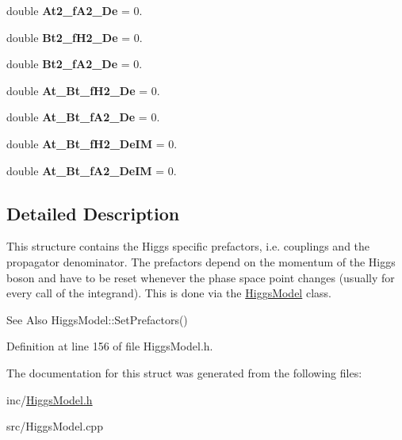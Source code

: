 \begin{DoxyCompactItemize}
\item 
\hypertarget{structHiggsPrefactors_a746d2ffd6c45dcdc4327a882d60a7f00}{double {\bfseries At2\-\_\-f\-A2\-\_\-\-De} = 0.}\label{structHiggsPrefactors_a746d2ffd6c45dcdc4327a882d60a7f00}

\item 
\hypertarget{structHiggsPrefactors_a28e6599f560ee1403abf1309d27f26e9}{double {\bfseries Bt2\-\_\-f\-H2\-\_\-\-De} = 0.}\label{structHiggsPrefactors_a28e6599f560ee1403abf1309d27f26e9}

\item 
\hypertarget{structHiggsPrefactors_a894d0baffbd6d76931cc9be61045dfd8}{double {\bfseries Bt2\-\_\-f\-A2\-\_\-\-De} = 0.}\label{structHiggsPrefactors_a894d0baffbd6d76931cc9be61045dfd8}

\item 
\hypertarget{structHiggsPrefactors_ab9024702de8509302dd74bdadf053f87}{double {\bfseries At\-\_\-\-Bt\-\_\-f\-H2\-\_\-\-De} = 0.}\label{structHiggsPrefactors_ab9024702de8509302dd74bdadf053f87}

\item 
\hypertarget{structHiggsPrefactors_a54f50c68645cb1897f2cc4031ecac7fd}{double {\bfseries At\-\_\-\-Bt\-\_\-f\-A2\-\_\-\-De} = 0.}\label{structHiggsPrefactors_a54f50c68645cb1897f2cc4031ecac7fd}

\item 
\hypertarget{structHiggsPrefactors_a9bd065464919ebbf509d5074dfbfb565}{double {\bfseries At\-\_\-\-Bt\-\_\-f\-H2\-\_\-\-De\-I\-M} = 0.}\label{structHiggsPrefactors_a9bd065464919ebbf509d5074dfbfb565}

\item 
\hypertarget{structHiggsPrefactors_a17aff31a83e303235ac71111b7ecb5a5}{double {\bfseries At\-\_\-\-Bt\-\_\-f\-A2\-\_\-\-De\-I\-M} = 0.}\label{structHiggsPrefactors_a17aff31a83e303235ac71111b7ecb5a5}

\end{DoxyCompactItemize}


\subsection{Detailed Description}
This structure contains the Higgs specific prefactors, i.\-e. couplings and the propagator denominator. The prefactors depend on the momentum of the Higgs boson and have to be reset whenever the phase space point changes (usually for every call of the integrand). This is done via the \hyperlink{classHiggsModel}{Higgs\-Model} class. \begin{DoxySeeAlso}{See Also}
Higgs\-Model\-::\-Set\-Prefactors() 
\end{DoxySeeAlso}


Definition at line 156 of file Higgs\-Model.\-h.



The documentation for this struct was generated from the following files\-:\begin{DoxyCompactItemize}
\item 
inc/\hyperlink{HiggsModel_8h}{Higgs\-Model.\-h}\item 
src/Higgs\-Model.\-cpp\end{DoxyCompactItemize}
